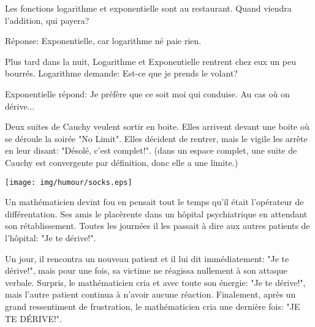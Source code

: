 	\begin{center}\underline{\hspace{5 cm}}\end{center}

Les fonctions logarithme et exponentielle sont au restaurant. Quand viendra l'addition, qui payera?

Réponse: Exponentielle, car logarithme né paie rien.

Plus tard dans la nuit, Logarithme et Exponentielle rentrent chez eux un peu bourrés. Logarithme demande: Est-ce que je prends le volant?

Exponentielle répond: Je préfère que ce soit moi qui conduise. Au cas où on dérive...

	\begin{center}\underline{\hspace{5 cm}}\end{center}

Deux suites de Cauchy veulent sortir en boite. Elles arrivent devant une boite où se déroule la soirée "No Limit". Elles décident de rentrer, mais le vigile les arrête en leur disant: "Désolé, c'est complet!". (dans un espace complet, une suite de Cauchy est convergente par définition, donc elle a une limite.)

	\begin{center}\underline{\hspace{5 cm}}\end{center}

	\begin{center}
		\texttt{[image: img/humour/socks.eps]}	
	\end{center}
	\begin{center}\underline{\hspace{5 cm}}\end{center}	

Un mathématicien devint fou en pensait tout le temps qu'il était l'opérateur de différentation. Ses amis le placèrente dans un hôpital psychiatrique en attendant son rétablissement. Toutes les journées il les passait à dire aux autres patients de l'hôpital: "Je te dérive!".

Un jour, il rencontra un nouveau patient et il lui dit immédiatement: "Je te dérive!", mais pour une fois, sa victime ne réagissa nullement à son attaque verbale. Surpris, le mathématicien cria et avec toute son énergie: "Je te dérive!", mais l'autre patient continua à n'avoir aucune réaction. Finalement, après un grand ressentiment de frustration, le mathématicien cria une dernière fois: "JE TE DÉRIVE!".

